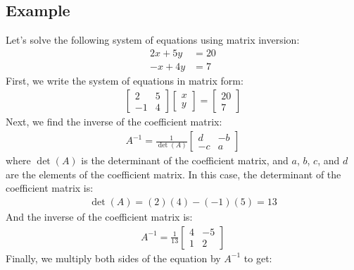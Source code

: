 \documentclass[12pt]{article}
\begin{document}
\subsection{Example}
Let's solve the following system of equations using matrix inversion:
\begin{align}
2x + 5y &= 20 \\
-x + 4y &= 7
\end{align}
First, we write the system of equations in matrix form:
\begin{align}
\begin{bmatrix}
2 & 5 \\
-1 & 4
\end{bmatrix}
\begin{bmatrix}
x \\
y
\end{bmatrix}
=
\begin{bmatrix}
20 \\
7
\end{bmatrix}
\end{align}
Next, we find the inverse of the coefficient matrix:
\begin{align}
A^{-1} = \frac{1}{\det(A)}
\begin{bmatrix}
d & -b \\
-c & a
\end{bmatrix}
\end{align}
where $\det(A)$ is the determinant of the coefficient matrix, and $a$, $b$, $c$, and $d$ are the elements of the coefficient matrix.
In this case, the determinant of the coefficient matrix is:
\begin{align}
\det(A) = (2)(4) - (-1)(5) = 13
\end{align}
And the inverse of the coefficient matrix is:
\begin{align}
A^{-1} = \frac{1}{13}
\begin{bmatrix}
4 & -5 \\
1 & 2
\end{bmatrix}
\end{align}
Finally, we multiply both sides of the equation by $A^{-1}$ to get:
\end{document}

